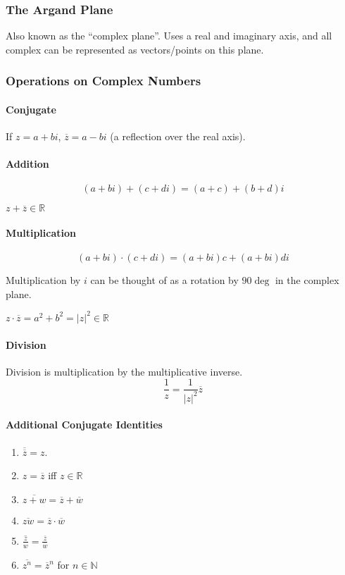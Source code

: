 \documentclass{article}
\begin{document}
\subsubsection{The Argand Plane} Also known as the ``complex plane''. Uses a real and imaginary axis, and all complex can be represented as vectors/points on this plane.

\subsubsection{Operations on Complex Numbers}
\paragraph{Conjugate}
If $z=a+bi$, $\overline{z}=a-bi$ (a reflection over the real axis).

\paragraph{Addition}
$$(a+bi) + (c+di) = (a+c) + (b+d)i$$

$z+\overline{z} \in \mathbb{R}$

\paragraph{Multiplication}
$$(a+bi) \cdot (c+di) = (a+bi)c + (a+bi)di$$

Multiplication by $i$ can be thought of as a rotation by $90\deg$ in the complex plane.

$z\cdot\overline{z} = a^2 + b^2 = |z|^2 \in \mathbb{R}$

\paragraph{Division}
Division is multiplication by the multiplicative inverse.
$$\frac{1}{z} = \frac{1}{|z|^2}\overline{z}$$

\paragraph{Additional Conjugate Identities}
\begin{enumerate}
    \item $\overline{\overline{z}} = z$.
    \item $z = \overline{z}$ iff $z\in\mathbb{R}$
    \item $\overline{z+w} = \overline{z} + \overline{w}$
    \item $\overline{zw} = \overline{z} \cdot \overline{w}$
    \item $\overline{\frac{z}{w}} = \frac{\overline{z}}{\overline{w}}$
    \item $\overline{z^n} = \overline{z}^n$ for $n \in\mathbb{N}$
\end{enumerate}
\end{document}

